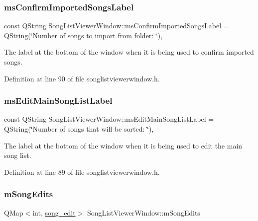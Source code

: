 \subsubsection{\texorpdfstring{ms\+Confirm\+Imported\+Songs\+Label}{msConfirmImportedSongsLabel}}
{\footnotesize\ttfamily const Q\+String Song\+List\+Viewer\+Window\+::ms\+Confirm\+Imported\+Songs\+Label = Q\+String(\char`\"{}Number of songs to import from folder\+: \char`\"{})\hspace{0.3cm}{\ttfamily [static]}, {\ttfamily [private]}}



The label at the bottom of the window when it is being used to confirm imported songs. 



Definition at line 90 of file songlistviewerwindow.\+h.

\mbox{\label{class_song_list_viewer_window_aced76ec4265d0194f9b793133e661406}} 
\subsubsection{\texorpdfstring{ms\+Edit\+Main\+Song\+List\+Label}{msEditMainSongListLabel}}
{\footnotesize\ttfamily const Q\+String Song\+List\+Viewer\+Window\+::ms\+Edit\+Main\+Song\+List\+Label = Q\+String(\char`\"{}Number of songs that will be sorted\+: \char`\"{})\hspace{0.3cm}{\ttfamily [static]}, {\ttfamily [private]}}



The label at the bottom of the window when it is being used to edit the main song list. 



Definition at line 89 of file songlistviewerwindow.\+h.

\mbox{\label{class_song_list_viewer_window_aa38d8a91dc7ebe0925602b3846c34fdc}} 
\subsubsection{\texorpdfstring{m\+Song\+Edits}{mSongEdits}}
{\footnotesize\ttfamily Q\+Map$<$int, \mbox{\hyperlink{struct_song_list_viewer_window_1_1song__edit}{song\+\_\+edit}}$>$ Song\+List\+Viewer\+Window\+::m\+Song\+Edits\hspace{0.3cm}{\ttfamily [private]}}




